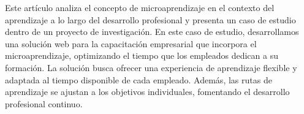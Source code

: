 Este artículo analiza el concepto de microaprendizaje en el contexto del
aprendizaje a lo largo del desarrollo profesional y presenta un caso de estudio
dentro de un proyecto de investigación. En este caso de estudio, desarrollamos
una solución web para la capacitación empresarial que incorpora el
microaprendizaje, optimizando el tiempo que los empleados dedican a su
formación. La solución busca ofrecer una experiencia de aprendizaje flexible y
adaptada al tiempo disponible de cada empleado. Además, las rutas de aprendizaje
se ajustan a los objetivos individuales, fomentando el desarrollo profesional
continuo.